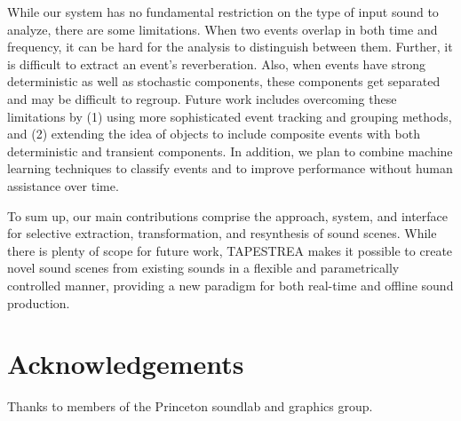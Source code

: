 \documentclass[twoside]{article}
\begin{document}
While our system has no fundamental restriction on the type of input sound to analyze,
there are some limitations. 
When two events overlap in both time and frequency, it can be hard for the
analysis to distinguish between them. 
Further, it is difficult to extract an event's reverberation. 
Also, when events have strong deterministic as well as 
stochastic components, these components get separated and may be difficult to regroup. 
Future work includes overcoming these limitations by (1) using more sophisticated event tracking 
and grouping methods, and (2) extending the idea of objects to include composite events with both 
deterministic and transient components. In addition, we plan to combine machine learning techniques 
to classify events and to improve performance without human assistance over time. 

To sum up, our main contributions comprise the approach, system, and interface for 
selective extraction, transformation, and resynthesis of sound scenes. While there is 
plenty of scope for future work, TAPESTREA makes it possible to create novel sound scenes 
from existing sounds in a flexible and parametrically controlled manner, providing a new paradigm 
for both real-time and offline sound production.

\section{Acknowledgements}
Thanks to members of the Princeton soundlab and graphics group. 


\end{document}
